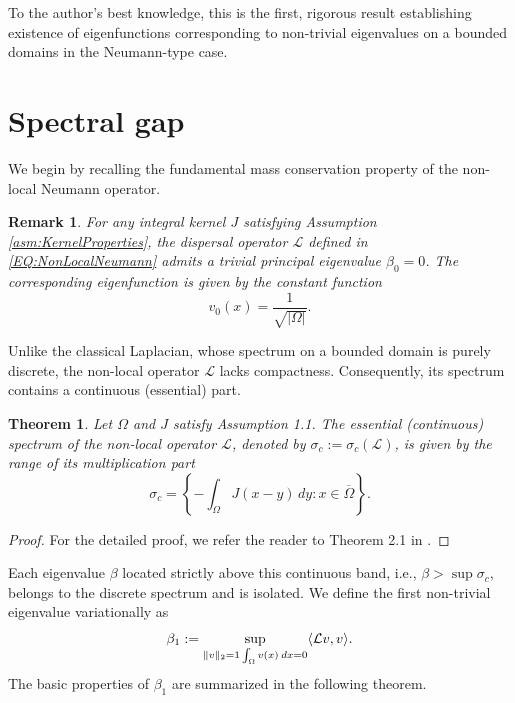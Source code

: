\documentclass[12pt, a4paper]{article}
\theoremstyle{break}
\newtheorem{thm}{Theorem}[section]
\theoremstyle{break}
\theoremstyle{break}
\theoremstyle{break}
\newtheorem{rem}{Remark}[section]
\theoremstyle{break}
\theoremstyle{break}
\theoremstyle{break}
\theoremstyle{break}
\theoremstyle{break}
\begin{document}
To the author's best knowledge, this is the first, rigorous result establishing existence of eigenfunctions corresponding to non-trivial eigenvalues on a bounded domains in the Neumann-type case.

\section{Spectral gap}

We begin by recalling the fundamental mass conservation property of the non-local Neumann operator.

\begin{rem}
    For any integral kernel $J$ satisfying Assumption \ref{asm:KernelProperties}, the dispersal operator $\mathcal{L}$ defined in \eqref{EQ:NonLocalNeumann} admits a trivial principal eigenvalue $\beta_0 = 0$. The corresponding eigenfunction is given by the constant function 
    \begin{equation}
        v_0(x) = \frac{1}{\sqrt{|\Omega|}}.
    \end{equation}
\end{rem}

Unlike the classical Laplacian, whose spectrum on a bounded domain is purely discrete, the non-local operator $\mathcal{L}$ lacks compactness. Consequently, its spectrum contains a continuous (essential) part.

\begin{thm}
    \label{thm:contninous_spectrum}
    Let $\Omega$ and $J$ satisfy Assumption 1.1. The essential (continuous) spectrum of the non-local operator $\mathcal{L}$, denoted by $\sigma_c := \sigma_c(\mathcal{L})$, is given by the range of its multiplication part
    \begin{equation}
        \sigma_c = \left\{ -\int_\Omega J(x-y) \,dy : x \in \overline{\Omega} \right\}.
    \end{equation}
\end{thm}
\begin{proof}
    For the detailed proof, we refer the reader to Theorem 2.1 in \cite{Tadej2025}.
\end{proof}
Each eigenvalue $\beta$ located strictly above this continuous band, i.e., $\beta > \sup \sigma_c$, belongs to the discrete spectrum and is isolated. We define the first non-trivial eigenvalue variationally as
\begin{equation}\label{eq:beta1_def}
    \beta_1 := \sup_{\|v\|_2 = 1 \\ \int_\Omega v(x) \:dx = 0} \langle \mathcal{L}v, v \rangle.
\end{equation}
The basic properties of $\beta_1$ are summarized in the following theorem.
\end{document}
